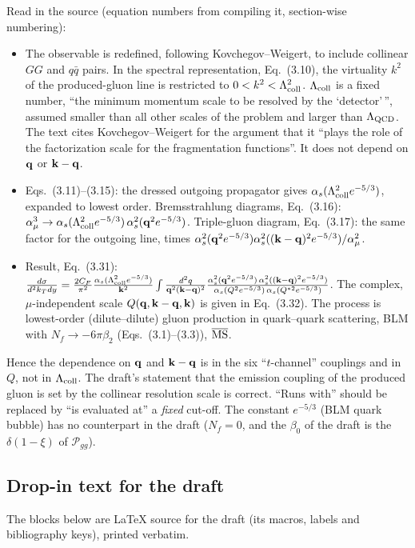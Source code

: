Read in the source (equation numbers from compiling it, section-wise numbering):
\begin{itemize}
\item The observable is redefined, following Kovchegov--Weigert, to include collinear $GG$ and $q\bar q$ pairs. In the spectral representation, Eq.~(3.10), the virtuality $k^2$ of the produced-gluon line is restricted to $0<k^2<\Lambda^2_{\rm coll}$. $\Lambda_{\rm coll}$ is a fixed number, ``the minimum momentum scale to be resolved by the `detector'\,'', assumed smaller than all other scales of the problem and larger than $\Lambda_{\rm QCD}$. The text cites Kovchegov--Weigert for the argument that it ``plays the role of the factorization scale for the fragmentation functions''. It does not depend on $\mathbf{q}$ or $\mathbf{k}-\mathbf{q}$.
\item Eqs.~(3.11)--(3.15): the dressed outgoing propagator gives $\alpha_s(\Lambda^2_{\rm coll}e^{-5/3})$, expanded to lowest order. Bremsstrahlung diagrams, Eq.~(3.16): $\alpha_\mu^3\to\alpha_s(\Lambda^2_{\rm coll}e^{-5/3})\,\alpha_s^2(\mathbf{q}^2e^{-5/3})$. Triple-gluon diagram, Eq.~(3.17): the same factor for the outgoing line, times $\alpha_s^2(\mathbf{q}^2e^{-5/3})\alpha_s^2((\mathbf{k}-\mathbf{q})^2e^{-5/3})/\alpha_\mu^2$.
\item Result, Eq.~(3.31): $\frac{d\sigma}{d^2k_Tdy}=\frac{2C_F}{\pi^2}\frac{\alpha_s(\Lambda^2_{\rm coll}e^{-5/3})}{\mathbf{k}^2}\int\frac{d^2q}{\mathbf{q}^2(\mathbf{k}-\mathbf{q})^2}\frac{\alpha_s^2(\mathbf{q}^2e^{-5/3})\,\alpha_s^2((\mathbf{k}-\mathbf{q})^2e^{-5/3})}{\alpha_s(Q^2e^{-5/3})\,\alpha_s(Q^{*2}e^{-5/3})}$. The complex, $\mu$-independent scale $Q(\mathbf{q},\mathbf{k}-\mathbf{q},\mathbf{k})$ is given in Eq.~(3.32). The process is lowest-order (dilute--dilute) gluon production in quark--quark scattering, BLM with $N_f\to-6\pi\beta_2$ (Eqs.~(3.1)--(3.3)), $\overline{\rm MS}$.
\end{itemize}
Hence the dependence on $\mathbf{q}$ and $\mathbf{k}-\mathbf{q}$ is in the six ``$t$-channel'' couplings and in $Q$, not in $\Lambda_{\rm coll}$. The draft's statement that the emission coupling of the produced gluon is set by the collinear resolution scale is correct. ``Runs with'' should be replaced by ``is evaluated at'' a \emph{fixed} cut-off. The constant $e^{-5/3}$ (BLM quark bubble) has no counterpart in the draft ($N_f=0$, and the $\beta_0$ of the draft is the $\delta(1-\xi)$ of $\mathcal P_{gg}$).

\subsection{Drop-in text for the draft}\label{sec:c-dropin}
The blocks below are LaTeX source for the draft (its macros, labels and bibliography keys), printed verbatim.


